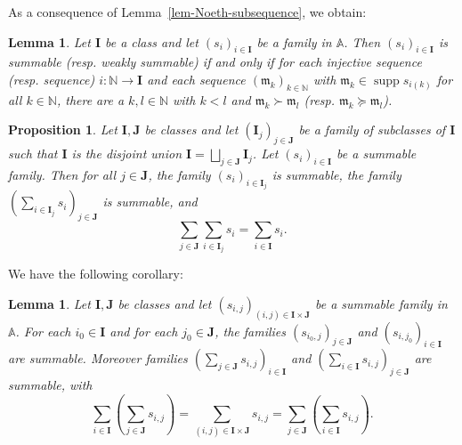 \documentclass{article}
\newcommand{\of}{:}
\newcommand{\tmem}[1]{{\em #1\/}}
\newcommand{\tmop}[1]{\ensuremath{\operatorname{#1}}}
\newtheorem{proposition}[theorem]{Proposition}
\newtheorem{lemma}[theorem]{Lemma}
\theoremstyle{remark}\newtheorem*{convention*}{Convention}
\begin{document}
As a consequence of Lemma~\ref{lem-Noeth-subsequence}, we obtain:

\begin{lemma}
  \label{lem-summable-bad-sequence}Let $\mathbf{I}$ be a class and let
  $(s_i)_{i \in \mathbf{I}}$ be a family in $\mathbb{A}$. Then $(s_i)_{i \in
  \mathbf{I}}$ is summable (resp. weakly summable) if and only if for each
  injective sequence (resp. sequence) $i \of \mathbb{N} \longrightarrow
  \mathbf{I}$ and each sequence $(\mathfrak{m}_k)_{k \in \mathbb{N}}$ with
  $\mathfrak{m}_k \in \tmop{supp} s_{i (k)}$ for all $k \in \mathbb{N}$, there
  are a $k, l \in \mathbb{N}$ with $k < l$ and $\mathfrak{m}_k \succ
  \mathfrak{m}_l$ (resp. $\mathfrak{m}_k \succcurlyeq \mathfrak{m}_l$).
\end{lemma}

\begin{proposition}
  \label{prop-summation-by-parts}{\tmem{{\cite[Proposition~3.1(e)]{vdH:noeth}}}}
  Let $\mathbf{I}, \mathbf{J}$ be classes and let $(\mathbf{I}_j)_{j \in
  \mathbf{J}}$ be a family of subclasses of $\mathbf{I}$ such that
  $\mathbf{I}$ is the disjoint union $\mathbf{I} = \bigsqcup_{j \in
  \mathbf{J}} \mathbf{I}_j$. Let $(s_i)_{i \in \mathbf{I}}$ be a summable
  family. Then for all $j \in \mathbf{J}$, the family $(s_i)_{i \in
  \mathbf{I}_j}$ is summable, the family $(\sum_{i \in \mathbf{I}_j} s_i)_{j
  \in \mathbf{J}}$ is summable, and
  \[ \sum_{j \in \mathbf{J}} \sum_{i \in \mathbf{I}_j} s_i = \sum_{i \in
     \mathbf{I}} s_i . \]
\end{proposition}

We have the following corollary:

\begin{lemma}
  \label{lem-Fubini}Let $\mathbf{I}, \mathbf{J}$ be classes and let $(s_{i,
  j})_{(i, j) \in \mathbf{I} \times \mathbf{J}}$ be a summable family in
  $\mathbb{A}$. For each $i_0 \in \mathbf{I}$ and for each $j_0 \in
  \mathbf{J}$, the families $(s_{i_0, j})_{j \in \mathbf{J}}$ and $(s_{i,
  j_0})_{i \in \mathbf{I}}$ are summable. Moreover families $\left( \sum_{j
  \in \mathbf{J}} s_{i, j} \right)_{i \in \mathbf{I}}$ and $\left( \sum_{i \in
  \mathbf{I}} s_{i, j} \right)_{j \in \mathbf{J}}$ are summable, with
  \[ \sum_{i \in \mathbf{I}} \left( \sum_{j \in \mathbf{J}} s_{i, j} \right)
     = \sum_{(i, j) \in \mathbf{I} \times \mathbf{J}} s_{i, j} = \sum_{j \in
     \mathbf{J}} \left( \sum_{i \in \mathbf{I}} s_{i, j} \right) . \]
\end{lemma}
\end{document}
